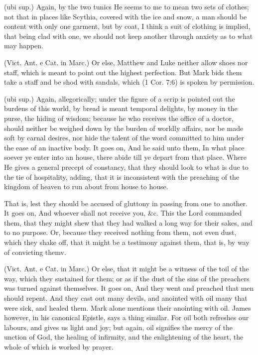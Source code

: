  (ubi sup.) Again, by the two tunics He seems to me to mean two sets of clothes; not that in places like Scythia, covered with the ice and snow, a man should be content with only one garment, but by coat, I think a suit of clothing is implied, that being clad with one, we should not keep another through anxiety as to what may happen.

 (Vict. Ant. e Cat. in Marc.) Or else, Matthew and Luke neither allow shoes nor staff, which is meant to point out the highest perfection. But Mark bids them take a staff and be shod with sandals, which (1 Cor. 7:6) is spoken by permission.

 (ubi sup.) Again, allegorically; under the figure of a scrip is pointed out the burdens of this world, by bread is meant temporal delights, by money in the purse, the hiding of wisdom; because he who receives the office of a doctor, should neither be weighed down by the burden of worldly affairs, nor be made soft by carnal desires, nor hide the talent of the word committed to him under the ease of an inactive body. It goes on, And he said unto them, In what place soever ye enter into an house, there abide till ye depart from that place. Where He gives a general precept of constancy, that they should look to what is due to the tie of hospitality, adding, that it is inconsistent with the preaching of the kingdom of heaven to run about from house to house.

 That is, lest they should be accused of gluttony in passing from one to another. It goes on, And whoever shall not receive you, \&c. This the Lord commanded them, that they might shew that they had walked a long way for their sakes, and to no purpose. Or, because they received nothing from them, not even dust, which they shake off, that it might be a testimony against them, that is, by way of convicting themv.

 (Vict. Ant. e Cat. in Marc.) Or else, that it might be a witness of the toil of the way, which they sustained for them; or as if the dust of the sins of the preachers was turned against themselves. It goes on, And they went and preached that men should repent. And they cast out many devils, and anointed with oil many that were sick, and healed them. Mark alone mentions their anointing with oil. James however, in his canonical Epistle, says a thing similar. For oil both refreshes our labours, and gives us light and joy; but again, oil signifies the mercy of the unction of God, the healing of infirmity, and the enlightening of the heart, the whole of which is worked by prayer.

